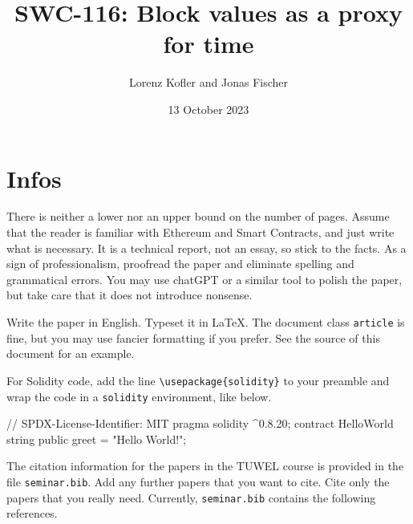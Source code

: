 \documentclass{article}
\title{SWC-116: Block values as a proxy for time}
\author{Lorenz Kofler and Jonas Fischer}
\date{13 October 2023}
\begin{document}
\maketitle

\section{Infos}
There is neither a lower nor an upper bound on the number of pages. Assume that
the reader is familiar with Ethereum and Smart Contracts, and just write what
is necessary. It is a technical report, not an essay, so stick to the facts. As
a sign of professionalism, proofread the paper and eliminate spelling and
grammatical errors. You may use chatGPT or a similar tool to polish the paper,
but take care that it does not introduce nonsense.

Write the paper in English. Typeset it in \LaTeX. The document class
\verb"article" is fine, but you may use fancier formatting if you prefer. See
the source of this document for an example.

For Solidity code, add the line  \verb"\usepackage{solidity}" to your preamble
and wrap the code in a \verb"solidity" environment, like below.
\begin{solidity}
// SPDX-License-Identifier: MIT
pragma solidity ^0.8.20;
contract HelloWorld {
    string public greet = "Hello World!";
}
\end{solidity}

The citation information for the papers in the TUWEL course is provided
in the file \verb"seminar.bib". Add any further papers that you want to cite.
Cite only the papers that you really need.
Currently, \verb"seminar.bib" contains the following references.
\nocite{*}


\end{document}
